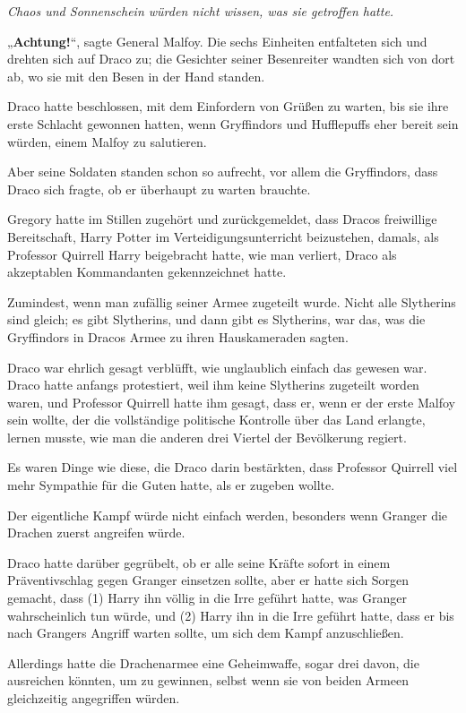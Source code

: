 {\emph{Chaos und Sonnenschein würden nicht wissen, was sie getroffen hatte.}

„\textbf{Achtung!}“, sagte General Malfoy. Die sechs Einheiten entfalteten sich und drehten sich auf Draco zu; die Gesichter seiner Besenreiter wandten sich von dort ab, wo sie mit den Besen in der Hand standen.

Draco hatte beschlossen, mit dem Einfordern von Grüßen zu warten, bis sie ihre erste Schlacht gewonnen hatten, wenn Gryffindors und Hufflepuffs eher bereit sein würden, einem Malfoy zu salutieren.

Aber seine Soldaten standen schon so aufrecht, vor allem die Gryffindors, dass Draco sich fragte, ob er überhaupt zu warten brauchte.

Gregory hatte im Stillen zugehört und zurückgemeldet, dass Dracos freiwillige Bereitschaft, Harry Potter im Verteidigungsunterricht beizustehen, damals, als Professor Quirrell Harry beigebracht hatte, wie man verliert, Draco als akzeptablen Kommandanten gekennzeichnet hatte.

Zumindest, wenn man zufällig seiner Armee zugeteilt wurde. Nicht alle Slytherins sind gleich; es gibt Slytherins, und dann gibt es Slytherins, war das, was die Gryffindors in Dracos Armee zu ihren Hauskameraden sagten.

Draco war ehrlich gesagt verblüfft, wie unglaublich einfach das gewesen war. Draco hatte anfangs protestiert, weil ihm keine Slytherins zugeteilt worden waren, und Professor Quirrell hatte ihm gesagt, dass er, wenn er der erste Malfoy sein wollte, der die vollständige politische Kontrolle über das Land erlangte, lernen musste, wie man die anderen drei Viertel der Bevölkerung regiert.

Es waren Dinge wie diese, die Draco darin bestärkten, dass Professor Quirrell viel mehr Sympathie für die Guten hatte, als er zugeben wollte.

Der eigentliche Kampf würde nicht einfach werden, besonders wenn Granger die Drachen zuerst angreifen würde.

Draco hatte darüber gegrübelt, ob er alle seine Kräfte sofort in einem Präventivschlag gegen Granger einsetzen sollte, aber er hatte sich Sorgen gemacht, dass (1) Harry ihn völlig in die Irre geführt hatte, was Granger wahrscheinlich tun würde, und (2) Harry ihn in die Irre geführt hatte, dass er bis nach Grangers Angriff warten sollte, um sich dem Kampf anzuschließen.

Allerdings hatte die Drachenarmee eine Geheimwaffe, sogar drei davon, die ausreichen könnten, um zu gewinnen, selbst wenn sie von beiden Armeen gleichzeitig angegriffen würden.

}
